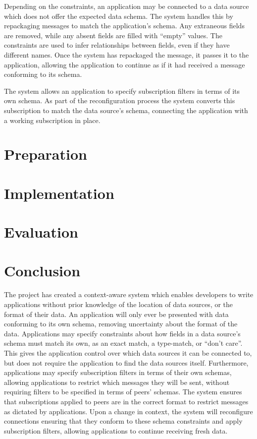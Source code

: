 \documentclass[12pt,twoside,notitlepage]{report}
\begin{document}
Depending on the constraints, an application may be connected to a data source which does not offer the expected data schema. 
The system handles this by repackaging messages to match the application's schema. Any extraneous fields are removed, while any absent fields are filled with ``empty'' values. The constraints are used to infer relationships between fields, even if they have different names. 
Once the system has repackaged the message, it passes it to the application, allowing the application to continue as if it had received a message conforming to its schema.

The system allows an application to specify subscription filters in terms of its own schema. 
As part of the reconfiguration process the system converts this subscription to match the data source's schema, connecting the application with a working subscription in place.

\cleardoublepage

 
\chapter{Preparation}


\cleardoublepage


\chapter{Implementation}


\cleardoublepage


\chapter{Evaluation}


\cleardoublepage

\chapter{Conclusion}

The project has created a context-aware system which enables developers to write applications without prior knowledge of the location of data sources, or the format of their data.
An application will only ever be presented with data conforming to its own schema, removing uncertainty about the format of the data. 
Applications may specify constraints about how fields in a data source's schema must match its own, as an exact match, a type-match, or ``don't care''.
This gives the application control over which data sources it can be connected to, but does not require the application to find the data sources itself. 
Furthermore, applications may specify subscription filters in terms of their own schemas, allowing applications to restrict which messages they will be sent, without requiring filters to be specified in terms of peers' schemas. 
The system ensures that subscriptions applied to peers are in the correct format to restrict messages as dictated by applications. 
Upon a change in context, the system will reconfigure connections ensuring that they conform to these schema constraints and apply subscription filters, allowing applications to continue receiving fresh data.
\end{document}
